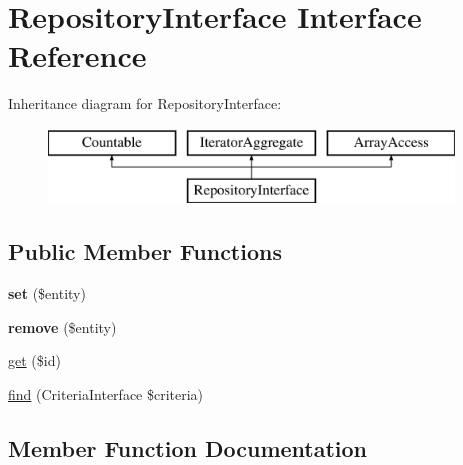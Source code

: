 \hypertarget{interface_pes_1_1_repository_1_1_repository_interface}{}\section{Repository\+Interface Interface Reference}
\label{interface_pes_1_1_repository_1_1_repository_interface}
Inheritance diagram for Repository\+Interface\+:\begin{figure}[H]
\begin{center}
\leavevmode
\includegraphics[height=2.000000cm]{interface_pes_1_1_repository_1_1_repository_interface}
\end{center}
\end{figure}
\subsection*{Public Member Functions}
\begin{DoxyCompactItemize}
\item 
\mbox{\label{interface_pes_1_1_repository_1_1_repository_interface_a7a857fce3c79fe2656435478cdab99d2}} 
{\bfseries set} (\$entity)
\item 
\mbox{\label{interface_pes_1_1_repository_1_1_repository_interface_a9ba1bf42939522398e98e21b528ad72b}} 
{\bfseries remove} (\$entity)
\item 
\mbox{\hyperlink{interface_pes_1_1_repository_1_1_repository_interface_a50e3bfb586b2f42932a6a93f3fbb0828}{get}} (\$id)
\item 
\mbox{\hyperlink{interface_pes_1_1_repository_1_1_repository_interface_ab3599f2abb8ba58d755cc8606f1d7724}{find}} (Criteria\+Interface \$criteria)
\end{DoxyCompactItemize}


\subsection{Member Function Documentation}
\mbox{\label{interface_pes_1_1_repository_1_1_repository_interface_ab3599f2abb8ba58d755cc8606f1d7724}} 
